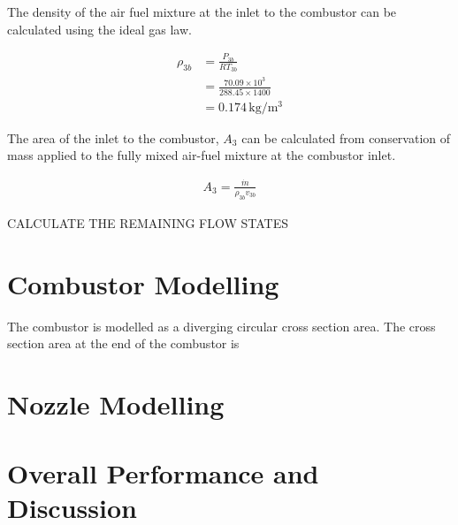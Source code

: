 \documentclass[a4paper]{article}
\begin{document}
The density of the air fuel mixture at the inlet to the combustor can be calculated using the ideal gas law.

\begin{align}
    \rho_{3b} &= \frac{P_{3b}}{RT_{3b}}\\
    &= \frac{70.09 \times 10^3}{288.45 \times 1400}\\
    &= 0.174 \, \mathrm{kg/m^3}
\end{align}

The area of the inlet to the combustor, \(A_3\) can be calculated from conservation of mass applied to the fully mixed air-fuel mixture at the combustor inlet.

\begin{align}
    A_3 = \frac{\dot{m}}{\rho_{3b} v_{3b}}
\end{align}

CALCULATE THE REMAINING FLOW STATES


\section{Combustor Modelling}

The combustor is modelled as a diverging circular cross section area. The cross section area at the end of the combustor is 

\section{Nozzle Modelling}

\section{Overall Performance and Discussion}
\end{document}
